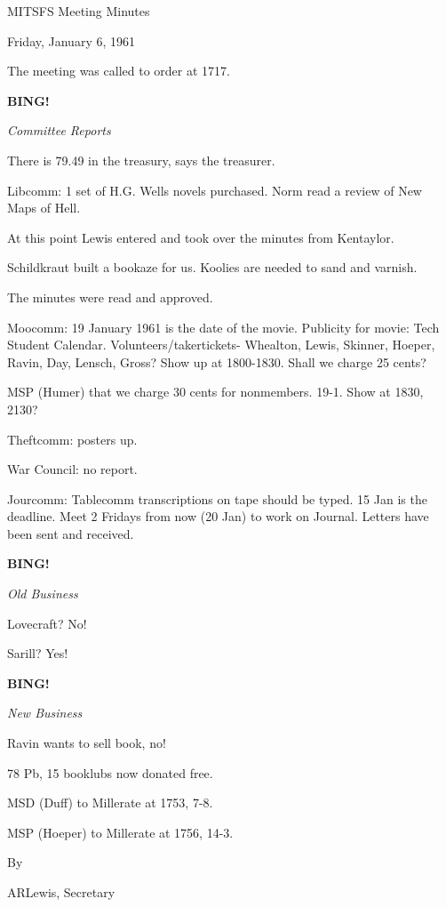 \documentclass[12pt]{article}
\newcommand{\bing}{{\bf BING!} }
\newcommand{\goto}[1]{\bing \vskip 12pt \centerline{{\em{#1}}}}
\begin{document}
\begin{center}

MITSFS Meeting Minutes

Friday, January 6, 1961

\end{center}
 
\vspace{12pt}

\setlength{\parskip}{6pt}

\noindent
The meeting was called to order at 1717.

\goto{Committee Reports}

There is 79.49 in the treasury, says the treasurer.

Libcomm: 1 set of H.G. Wells novels purchased. Norm read a review of New Maps of Hell.

At this point Lewis entered and took over the minutes from Kentaylor.

Schildkraut built a bookaze for us. Koolies are needed to sand and varnish.

The minutes were read and approved.

Moocomm: 19 January 1961 is the date of the movie. Publicity for movie: Tech Student Calendar. Volunteers/takertickets- Whealton, Lewis, Skinner, Hoeper, Ravin, Day, Lensch, Gross? Show up at 1800-1830. Shall we charge 25 cents?

MSP (Humer) that we charge 30 cents for nonmembers. 19-1. Show at 1830, 2130?

Theftcomm: posters up.

War Council: no report.

Jourcomm: Tablecomm transcriptions on tape should be typed. 15 Jan is the deadline. Meet 2 Fridays from now (20 Jan) to work on Journal. Letters have been sent and received.

\goto{Old Business}

Lovecraft? No!

Sarill? Yes!

\goto{New Business}

Ravin wants to sell book, no!

78 Pb, 15 booklubs now donated free.

MSD (Duff) to Millerate at 1753, 7-8.

MSP (Hoeper) to Millerate at 1756, 14-3.

\vspace{12pt}

\centerline{By}
\centerline{ARLewis, Secretary}
\end{document}
